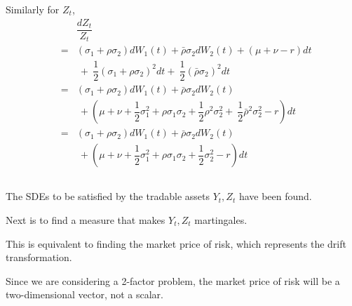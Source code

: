 \documentclass[uplatex,a4j,12pt,dvipdfmx]{jsarticle}
\begin{document}
Similarly for $Z_{t}$,
%
%
\begin{eqnarray*}
	&&
	\dfrac{dZ_{t}}{Z_{t}}
	\\[2mm] &=&
	(\sigma_{1} + \rho \sigma_{2}) dW_{1}(t)
	+ \bar{\rho} \sigma_{2} dW_{2}(t)
	+ ( \mu + \nu - r ) dt
	\\ && \
	+ \
	\dfrac{1}{2} (\sigma_{1} + \rho \sigma_{2})^{2} dt
	+ \
	\dfrac{1}{2} (\bar{\rho} \sigma_{2})^{2} dt
	\\[2mm] &=&
	(\sigma_{1} + \rho \sigma_{2}) dW_{1}(t)
	+ \bar{\rho} \sigma_{2} dW_{2}(t)
	\\ && \ +
	\left(
	\mu + \nu +
	\dfrac{1}{2} \sigma_{1}^{2} + \rho \sigma_{1} \sigma_{2} + \dfrac{1}{2} \rho^{2} \sigma_{2}^{2}
	+ \
	\dfrac{1}{2} \bar{\rho}^{2} \sigma_{2}^{2}
	- r
	\right) dt
	\\[2mm] &=&
	(\sigma_{1} + \rho \sigma_{2}) dW_{1}(t)
	+ \bar{\rho} \sigma_{2} dW_{2}(t)
	\\ && \ +
	\left(
	\mu + \nu +
	\dfrac{1}{2} \sigma_{1}^{2} + \rho \sigma_{1} \sigma_{2} + \dfrac{1}{2} \sigma_{2}^{2}
	- r
	\right) dt
\end{eqnarray*}
%
%

${}$

The SDEs to be satisfied by the tradable assets $Y_{t},Z_{t}$ have been found.

Next is to find a measure that makes $Y_{t},Z_{t}$ martingales.

This is equivalent to finding the market price of risk, which represents the drift transformation.

Since we are considering a 2-factor problem, the market price of risk will be a two-dimensional vector, not a scalar.
\end{document}
